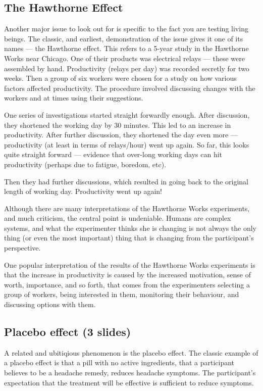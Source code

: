 \documentclass[12pt]{article}
\begin{document}
\subsection{The Hawthorne Effect}

Another major issue to look out for is specific to the fact you are
testing living beings. The classic, and earliest, demonstration of the
issue gives it one of its names --- the Hawthorne effect. This refers
to a 5-year study in the Hawthorne Works near Chicago. One of their
products was electrical relays --- these were assembled by
hand. Productivity (relays per day) was recorded secretly for two
weeks. Then a group of six workers were chosen for a study on how
various factors affected productivity. The procedure involved
discussing changes with the workers and at times using their
suggestions.

One series of investigations started straight forwardly enough. After
discussion, they shortened the working day by 30 minutes. This led to
an increase in productivity. After further discussion, they shortened
the day even more --- productivity (at least in terms of relays/hour)
went up again. So far, this looks quite straight forward --- evidence
that over-long working days can hit productivity (perhaps due to
fatigue, boredom, etc).

Then they had further discussions, which resulted in going back to the
original length of working day. Productivity went up again!

Although there are many interpretations of the Hawthorne Works
experiments, and much criticism, the central point is
undeniable. Humans are complex systems, and what the experimenter
thinks she is changing is not always the only thing (or even the most
important) thing that is changing from the participant's perspective.

One popular interpretation of the results of the Hawthorne Works
experiments is that the increase in productivity is caused by the
increased motivation, sense of worth, importance, and so forth, that
comes from the experimenters selecting a group of workers, being
interested in them, monitoring their behaviour, and discussing options
with them.

\subsection{Placebo effect (3 slides)}

A related and ubitiqious phenomenon is the placebo effect. The classic
example of a placebo effect is that a pill with no active ingredients,
that a participant believes to be a headache remedy, reduces headache
symptoms. The participant's expectation that the treatment will be
effective is sufficient to reduce symptoms.
\end{document}
